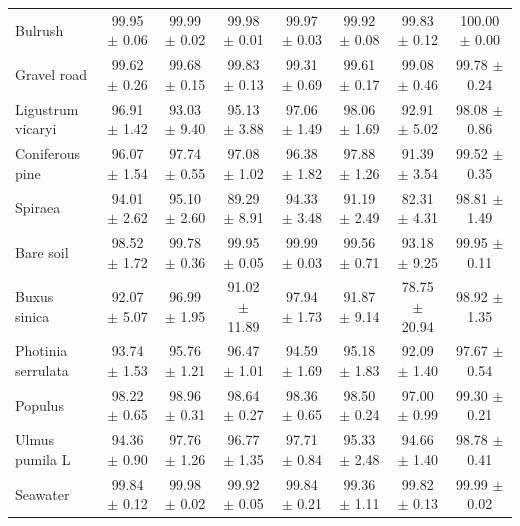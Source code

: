 \begin{table}[htbp]
{\begin{tabular}{l c c c c c c c}
    Bulrush & 99.95 $\pm$ 0.06 & \textcolor{tgblue}{99.99 $\pm$ 0.02} & \textcolor{tgred}{99.98 $\pm$ 0.01} & 99.97 $\pm$ 0.03 & 99.92 $\pm$ 0.08 & 99.83 $\pm$ 0.12 & \textcolor{tgteal}{100.00 $\pm$ 0.00} \\
    Gravel road & 99.62 $\pm$ 0.26 & \textcolor{tgred}{99.68 $\pm$ 0.15} & \textcolor{tgteal}{99.83 $\pm$ 0.13} & 99.31 $\pm$ 0.69 & 99.61 $\pm$ 0.17 & 99.08 $\pm$ 0.46 & \textcolor{tgblue}{99.78 $\pm$ 0.24} \\
    Ligustrum vicaryi & 96.91 $\pm$ 1.42 & 93.03 $\pm$ 9.40 & 95.13 $\pm$ 3.88 & \textcolor{tgred}{97.06 $\pm$ 1.49} & \textcolor{tgblue}{98.06 $\pm$ 1.69} & 92.91 $\pm$ 5.02 & \textcolor{tgteal}{98.08 $\pm$ 0.86} \\
    Coniferous pine & 96.07 $\pm$ 1.54 & \textcolor{tgred}{97.74 $\pm$ 0.55} & 97.08 $\pm$ 1.02 & 96.38 $\pm$ 1.82 & \textcolor{tgblue}{97.88 $\pm$ 1.26} & 91.39 $\pm$ 3.54 & \textcolor{tgteal}{99.52 $\pm$ 0.35} \\
    Spiraea & 94.01 $\pm$ 2.62 & \textcolor{tgblue}{95.10 $\pm$ 2.60} & 89.29 $\pm$ 8.91 & \textcolor{tgred}{94.33 $\pm$ 3.48} & 91.19 $\pm$ 2.49 & 82.31 $\pm$ 4.31 & \textcolor{tgteal}{98.81 $\pm$ 1.49} \\
    Bare soil & 98.52 $\pm$ 1.72 & \textcolor{tgred}{99.78 $\pm$ 0.36} & \textcolor{tgblue}{99.95 $\pm$ 0.05} & \textcolor{tgteal}{99.99 $\pm$ 0.03} & 99.56 $\pm$ 0.71 & 93.18 $\pm$ 9.25 & \textcolor{tgblue}{99.95 $\pm$ 0.11} \\
    Buxus sinica & 92.07 $\pm$ 5.07 & \textcolor{tgred}{96.99 $\pm$ 1.95} & 91.02 $\pm$ 11.89 & \textcolor{tgblue}{97.94 $\pm$ 1.73} & 91.87 $\pm$ 9.14 & 78.75 $\pm$ 20.94 & \textcolor{tgteal}{98.92 $\pm$ 1.35} \\
    Photinia serrulata & 93.74 $\pm$ 1.53 & \textcolor{tgred}{95.76 $\pm$ 1.21} & \textcolor{tgblue}{96.47 $\pm$ 1.01} & 94.59 $\pm$ 1.69 & 95.18 $\pm$ 1.83 & 92.09 $\pm$ 1.40 & \textcolor{tgteal}{97.67 $\pm$ 0.54} \\
    Populus & 98.22 $\pm$ 0.65 & \textcolor{tgblue}{98.96 $\pm$ 0.31} & \textcolor{tgred}{98.64 $\pm$ 0.27} & 98.36 $\pm$ 0.65 & 98.50 $\pm$ 0.24 & 97.00 $\pm$ 0.99 & \textcolor{tgteal}{99.30 $\pm$ 0.21} \\
    Ulmus pumila L & 94.36 $\pm$ 0.90 & \textcolor{tgblue}{97.76 $\pm$ 1.26} & 96.77 $\pm$ 1.35 & \textcolor{tgred}{97.71 $\pm$ 0.84} & 95.33 $\pm$ 2.48 & 94.66 $\pm$ 1.40 & \textcolor{tgteal}{98.78 $\pm$ 0.41} \\
    Seawater & 99.84 $\pm$ 0.12 & \textcolor{tgblue}{99.98 $\pm$ 0.02} & \textcolor{tgred}{99.92 $\pm$ 0.05} & 99.84 $\pm$ 0.21 & 99.36 $\pm$ 1.11 & 99.82 $\pm$ 0.13 & \textcolor{tgteal}{99.99 $\pm$ 0.02} \\

\end{tabular}}
\end{table}
